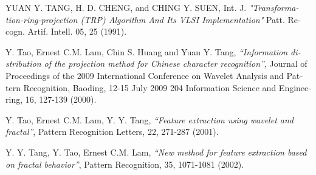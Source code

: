\documentclass[10pt,a4paper]{article}
\begin{document}
\newpage
\begin{thebibliography}{1}
\begin{latin}
   YUAN Y. TANG, H. D. CHENG, and CHING Y. SUEN, Int. J. {\em "Transformation-ring-projection (TRP) Algorithm And Its VLSI Implementation"} Patt. Recogn. Artif. Intell. 05, 25 (1991).

   Y. Tao, Ernest C.M. Lam, Chin S. Huang and Yuan Y. Tang, {\em “Information distribution of the projection method for Chinese character recognition”}, Journal of Proceedings of the 2009 International Conference on Wavelet Analysis and Pattern Recognition, Baoding, 12-15 July 2009 204 Information Science and Engineering, 16, 127-139 (2000).
  
   Y. Tao, Ernest C.M. Lam, Y. Y. Tang, {\em “Feature extraction using wavelet and fractal”}, Pattern Recognition Letters, 22, 271-287 (2001). 
  
   Y. Y. Tang, Y. Tao, Ernest C.M. Lam, {\em “New method for feature extraction based on fractal behavior”}, Pattern Recognition, 35, 1071-1081 (2002).
\end{latin}
\end{thebibliography}
\end{document}
